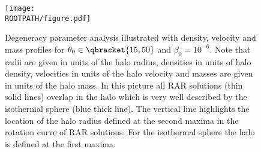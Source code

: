 \begin{figure}%
	\centering%
	\texttt{[image: \\ROOTPATH/figure.pdf]}
	\caption{Degeneracy parameter analysis illustrated with density, velocity and mass profiles for $\theta_0\in\qbracket{15,50}$ and $\beta_0 = 10^{-6}$. Note that radii are given in units of the halo radius, densities in units of halo density, velocities in units of the halo velocity and masses are given in units of the halo mass. In this picture all RAR solutions (thin solid lines) overlap in the halo which is very well described by the isothermal sphere (blue thick line). The vertical line highlights the location of the halo radius defined at the second maxima in the rotation curve of RAR solutions. For the isothermal sphere the halo is defined at the first maxima.}%
	\label{fig:profiles:without-cutoff:central-degeneracy:halo}%
\end{figure}
